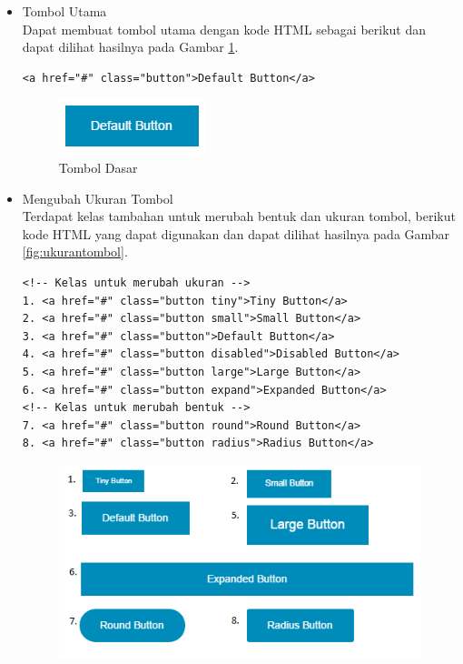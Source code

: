 \begin{itemize}
\begin{itemize}
\begin{enumerate}[(1)]
\begin{itemize}
\item Tombol Utama\\
Dapat membuat tombol utama dengan kode HTML sebagai berikut dan dapat
dilihat hasilnya pada Gambar \ref{fig:tomboldasar}.
\begin{lstlisting}[basicstyle=\footnotesize]
<a href="#" class="button">Default Button</a>
\end{lstlisting}
\begin{figure}[H]
\centering
\includegraphics[scale=1]{Gambar/tomboldasar.png}
\caption[Tombol Dasar]{Tombol Dasar}
\label{fig:tomboldasar}
\end{figure}
\item Mengubah Ukuran Tombol\\
Terdapat kelas tambahan untuk merubah bentuk dan ukuran tombol, berikut kode
HTML yang dapat digunakan dan dapat dilihat hasilnya pada Gambar
\ref{fig:ukurantombol}.
\begin{lstlisting}[basicstyle=\footnotesize]
<!-- Kelas untuk merubah ukuran -->
1. <a href="#" class="button tiny">Tiny Button</a>
2. <a href="#" class="button small">Small Button</a>
3. <a href="#" class="button">Default Button</a>
4. <a href="#" class="button disabled">Disabled Button</a>
5. <a href="#" class="button large">Large Button</a>
6. <a href="#" class="button expand">Expanded Button</a>
<!-- Kelas untuk merubah bentuk -->
7. <a href="#" class="button round">Round Button</a>
8. <a href="#" class="button radius">Radius Button</a>
\end{lstlisting}
\begin{figure}[H]
\centering
\includegraphics[scale=1]{Gambar/ukurantombol.png}

\end{figure}
\end{itemize}
\end{enumerate}
\end{itemize}
\end{itemize}
